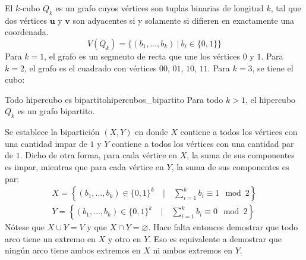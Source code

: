 El \(k\)-cubo \(Q_k\) es un grafo cuyos vértices son tuplas binarias de longitud \(k\), tal que dos vértices \(\mathbf{u}\) y \(\mathbf{v}\) son adyacentes si y solamente si difieren en exactamente una coordenada. \[
V (Q_k) = \{(b_1,\ldots,b_k) \ | \ b_i \in \{0,1\}\}
\] Para \(k = 1\), el grafo es un segmento de recta que une los vértices \(0\) y \(1\). Para \(k=2\), el grafo es el cuadrado con vértices \(00\), \(01\), \(10\), \(11\). Para \(k=3\), se tiene el cubo:
\begin{center}
\end{center}

\begin{teorema}{Todo hipercubo es bipartito}{hipercubos_bipartito}
  Para todo \(k>1\), el hipercubo \(Q_k\) es un grafo bipartito.
\end{teorema}

Se establece la bipartición \((X,Y)\) en donde \(X\) contiene a todos los vértices con una cantidad impar de \(1\) y \(Y\) contiene a todos los vértices con una cantidad par de \(1\). Dicho de otra forma, para cada vértice en \(X\), la suma de sus componentes es impar, mientras que para cada vértice en \(Y\), la suma de sus componentes es par:\begin{gather*}
X = \left\{(b_1,\ldots,b_k) \in \{0,1\}^k \quad \Big| \quad \sum_{i=1}^kb_i \equiv 1\mod 2\right\} \\
Y = \left\{(b_1,\ldots,b_k) \in \{0,1\}^k \quad \Big| \quad \sum_{i=1}^kb_i \equiv 0\mod 2\right\}
\end{gather*}Nótese que \(X \cup Y = V\) y que \(X \cap Y = \varnothing\). Hace falta entonces demostrar que todo arco tiene un extremo en \(X\) y otro en \(Y\). Eso es equivalente a demostrar que ningún arco tiene ambos extremos en \(X\) ni ambos extremos en \(Y\).

